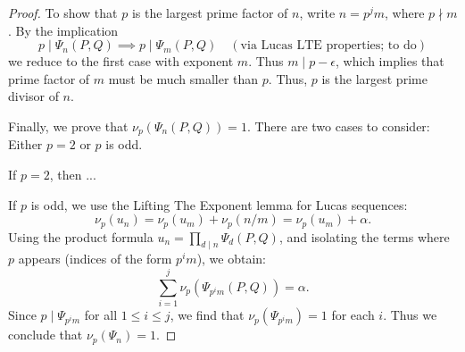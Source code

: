 \begin{proof}
  To show that $p$ is the largest prime factor of $n$, write $n=p^jm$, where $p\nmid m$. By the implication
  \begin{equation*}
    p \mid \Psi_n(P,Q) \implies p \mid \Psi_m(P,Q) \quad (\text{via Lucas LTE properties; to do})
  \end{equation*}
  we reduce to the first case with exponent $m$. Thus $m\mid p-\epsilon$, which implies that prime factor of $m$ must be much smaller than $p$. Thus, $p$ is the largest prime divisor of $n$.
  
  Finally, we prove that $\nu_p(\Psi_n(P,Q))=1$. There are two cases to consider: Either $p=2$ or $p$ is odd.

  If $p=2$, then ...
  
  If $p$ is odd, we use the Lifting The Exponent lemma for Lucas sequences:
  \begin{equation*}
    \nu_p(u_n) = \nu_p(u_m) + \nu_p(n/m) = \nu_p(u_m) + \alpha.
  \end{equation*}
  Using the product formula $u_n=\prod_{d\mid n}\Psi_d(P,Q)$, and isolating the terms where $p$ appears (indices of the form $p^im$), we obtain:
  \begin{equation*}
    \sum_{i=1}^j \nu_p(\Psi_{p^i m}(P,Q)) = \alpha.
  \end{equation*}
  Since $p\mid \Psi_{p^im}$ for all $1\leq i\leq j$, we find that $\nu_p(\Psi_{p^im})=1$ for each $i$. Thus we conclude that $\nu_p(\Psi_n)=1$.
\end{proof}

